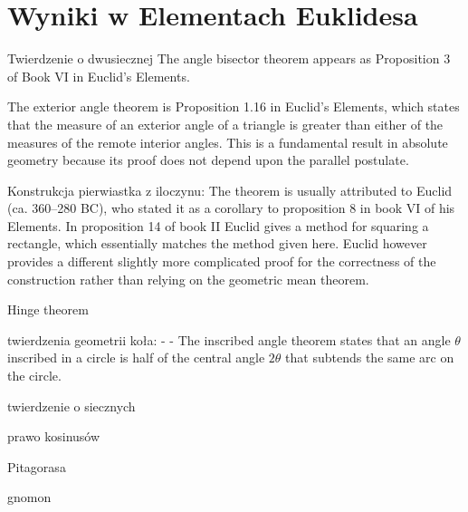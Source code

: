 \documentclass{parchment}
\begin{document}
\section{Wyniki w Elementach Euklidesa}


Twierdzenie o dwusiecznej %
The angle bisector theorem appears as Proposition 3 of Book VI in Euclid's Elements. 

The exterior angle theorem is Proposition 1.16 in Euclid's Elements, which states that the measure of an exterior angle of a triangle is greater than either of the measures of the remote interior angles. This is a fundamental result in absolute geometry because its proof does not depend upon the parallel postulate. %

Konstrukcja pierwiastka z iloczynu:
The theorem is usually attributed to Euclid (ca. 360–280 BC), who stated it as a corollary to proposition 8 in book VI of his Elements. In proposition 14 of book II Euclid gives a method for squaring a rectangle, which essentially matches the method given here. Euclid however provides a different slightly more complicated proof for the correctness of the construction rather than relying on the geometric mean theorem.


Hinge theorem %

twierdzenia geometrii koła:
- %
- The inscribed angle theorem states that an angle $\theta$ inscribed in a circle is half of the central angle $2\theta$ that subtends the same arc on the circle. 



twierdzenie o siecznych

prawo kosinusów

Pitagorasa %

gnomon %
\end{document}
